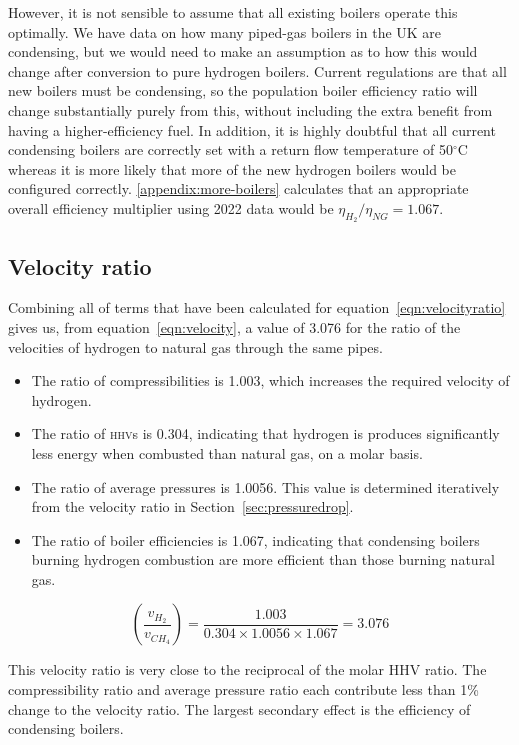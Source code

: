 \documentclass[5p]{elsarticle} %
\begin{document}
However, it is not sensible to assume that all existing boilers operate this optimally.
We have data on how many piped-gas boilers in the UK are condensing, but we would need to make an assumption as to how this would change after conversion to pure hydrogen boilers. 
Current regulations\citep{GASTEC2009} are that all new boilers must be condensing, so the population boiler efficiency ratio will change substantially purely from this, without including the extra benefit from having a higher-efficiency fuel. 
In addition, it is highly doubtful that all current condensing boilers are correctly set with a return flow temperature of 50$^\circ$C whereas it is more likely that more of the new hydrogen boilers would be configured correctly. 
\ref{appendix:more-boilers} calculates that an appropriate overall efficiency multiplier using 2022 data would be $\eta_{H_2} / \eta_{NG} = 1.067$.

\subsection{Velocity ratio}
\label{sec:velocity}

Combining all of terms that have been calculated for equation~\eqref{eqn:velocityratio} gives us,  from equation~\eqref{eqn:velocity}, a value of 3.076 for the ratio of the velocities of hydrogen to natural gas through the same pipes.
\begin{itemize}
    \item The ratio of compressibilities is 1.003, which increases the required velocity of hydrogen.
    \item The ratio of \textsc{hhv}s is 0.304, indicating that hydrogen is produces significantly less energy when combusted than natural gas, on a molar basis.
    \item The ratio of average pressures is 1.0056. This value is determined iteratively from the velocity ratio in Section~\ref{sec:pressuredrop}.
    \item The ratio of boiler efficiencies is 1.067, indicating that condensing boilers burning hydrogen combustion are more efficient than those burning natural gas. 
\end{itemize}

\begin{equation}
\label{eqn:velocity}
    \left(\frac{v_{H_2}}{v_{CH_4}}\right) = \frac{1.003}{0.304 \times  1.0056 \times 1.067} = \mathbf{3.076}
\end{equation}

This velocity ratio is very close to the reciprocal of the molar HHV ratio.
The compressibility ratio and average pressure ratio each contribute less than 1\% change to the velocity ratio.
The largest secondary effect is the efficiency of condensing boilers. 
\end{document}

